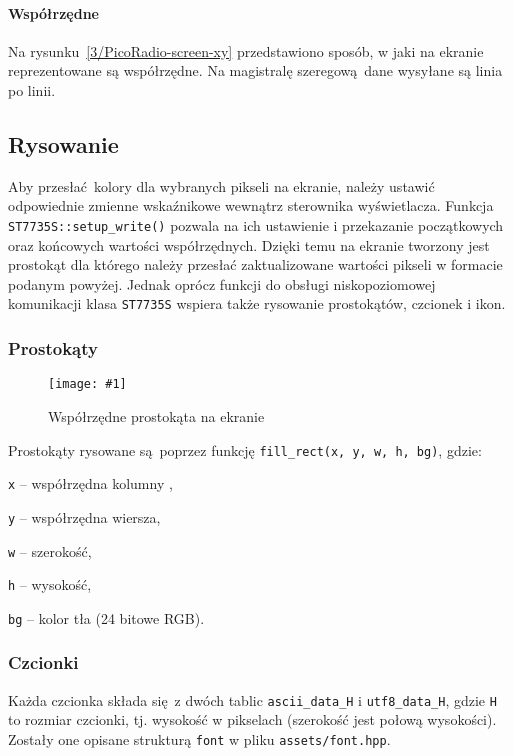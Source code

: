 \documentclass[polish]{aghengthesis}
\let\tempone\itemize
\let\temptwo\enditemize
\renewenvironment{itemize}{\tempone\setlength{\itemsep}{0cm}}{\temptwo}
\newcommand{\imgint}[4]{
	\begin{figure}[{#4}]
		\centering
		\texttt{[image: \#1]}
		\caption{#2}
		\label{#1}
	\end{figure}
}
\newcommand{\imgh}[3]{\imgint{#1}{#2}{#3}{H}}
\begin{document}
		\paragraph{Współrzędne}
			Na rysunku~\ref{3/PicoRadio-screen-xy} przedstawiono sposób, w jaki na ekranie reprezentowane są współrzędne. Na magistralę szeregową dane wysyłane są linia po linii.
		
		\subsection{Rysowanie}
			Aby przesłać kolory dla wybranych pikseli na ekranie, należy ustawić odpowiednie zmienne wskaźnikowe wewnątrz sterownika wyświetlacza. Funkcja \lstinline|ST7735S::setup_write()| pozwala na ich ustawienie i przekazanie początkowych oraz końcowych wartości współrzędnych. Dzięki temu na ekranie tworzony jest prostokąt dla którego należy przesłać zaktualizowane wartości pikseli w formacie podanym powyżej. Jednak oprócz funkcji do obsługi niskopoziomowej komunikacji klasa \lstinline|ST7735S|  wspiera także rysowanie prostokątów, czcionek i ikon.
			
			\subsubsection{Prostokąty}
				\imgh{3/PicoRadio-screen-rect}{Współrzędne prostokąta na ekranie}{0.6}
				Prostokąty rysowane są poprzez funkcję \lstinline|fill_rect(x, y, w, h, bg)|, gdzie:
				\begin{itemize}
					\item \lstinline|x| -- współrzędna kolumny ,
					\item \lstinline|y| -- współrzędna wiersza,
					\item \lstinline|w| -- szerokość,
					\item \lstinline|h| -- wysokość,
					\item \lstinline|bg| -- kolor tła (24 bitowe RGB).
				\end{itemize}
			
			\subsubsection{Czcionki}
				Każda czcionka składa się z dwóch tablic \lstinline|ascii_data_H| i \lstinline|utf8_data_H|, gdzie \lstinline|H| to rozmiar czcionki, tj. wysokość w pikselach (szerokość jest połową wysokości). Zostały one opisane strukturą \lstinline|font| w pliku \lstinline|assets/font.hpp|.
				
\end{document}
